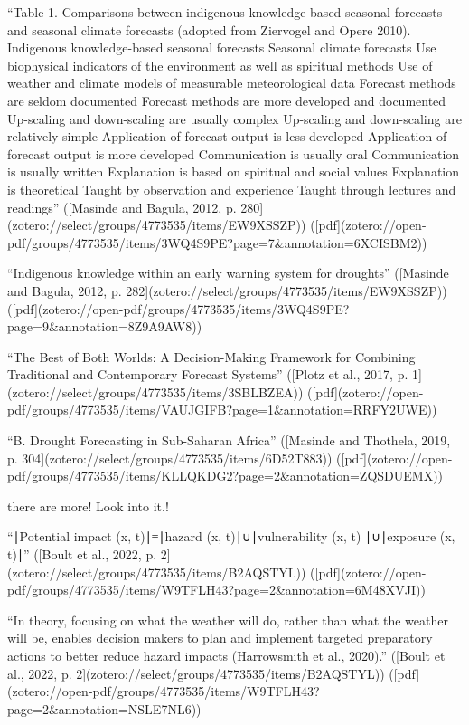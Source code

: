 {“Table 1. Comparisons between indigenous knowledge-based seasonal forecasts and seasonal climate forecasts (adopted from Ziervogel and Opere 2010). Indigenous knowledge-based seasonal forecasts Seasonal climate forecasts Use biophysical indicators of the environment as well as spiritual methods Use of weather and climate models of measurable meteorological data Forecast methods are seldom documented Forecast methods are more developed and documented Up-scaling and down-scaling are usually complex Up-scaling and down-scaling are relatively simple Application of forecast output is less developed Application of forecast output is more developed Communication is usually oral Communication is usually written Explanation is based on spiritual and social values Explanation is theoretical Taught by observation and experience Taught through lectures and readings” ([Masinde and Bagula, 2012, p. 280](zotero://select/groups/4773535/items/EW9XSSZP)) ([pdf](zotero://open-pdf/groups/4773535/items/3WQ4S9PE?page=7&annotation=6XCISBM2))

“Indigenous knowledge within an early warning system for droughts” ([Masinde and Bagula, 2012, p. 282](zotero://select/groups/4773535/items/EW9XSSZP)) ([pdf](zotero://open-pdf/groups/4773535/items/3WQ4S9PE?page=9&annotation=8Z9A9AW8))

“The Best of Both Worlds: A Decision-Making Framework for Combining Traditional and Contemporary Forecast Systems” ([Plotz et al., 2017, p. 1](zotero://select/groups/4773535/items/3SBLBZEA)) ([pdf](zotero://open-pdf/groups/4773535/items/VAUJGIFB?page=1&annotation=RRFY2UWE))

“B. Drought Forecasting in Sub-Saharan Africa” ([Masinde and Thothela, 2019, p. 304](zotero://select/groups/4773535/items/6D52T883)) ([pdf](zotero://open-pdf/groups/4773535/items/KLLQKDG2?page=2&annotation=ZQSDUEMX))

there are more! Look into it.!

“∣Potential impact (x, t)∣≡∣hazard (x, t)∣∪∣vulnerability (x, t) ∣∪∣exposure (x, t)∣” ([Boult et al., 2022, p. 2](zotero://select/groups/4773535/items/B2AQSTYL)) ([pdf](zotero://open-pdf/groups/4773535/items/W9TFLH43?page=2&annotation=6M48XVJI))

“In theory, focusing on what the weather will do, rather than what the weather will be, enables decision makers to plan and implement targeted preparatory actions to better reduce hazard impacts (Harrowsmith et al., 2020).” ([Boult et al., 2022, p. 2](zotero://select/groups/4773535/items/B2AQSTYL)) ([pdf](zotero://open-pdf/groups/4773535/items/W9TFLH43?page=2&annotation=NSLE7NL6))

}
